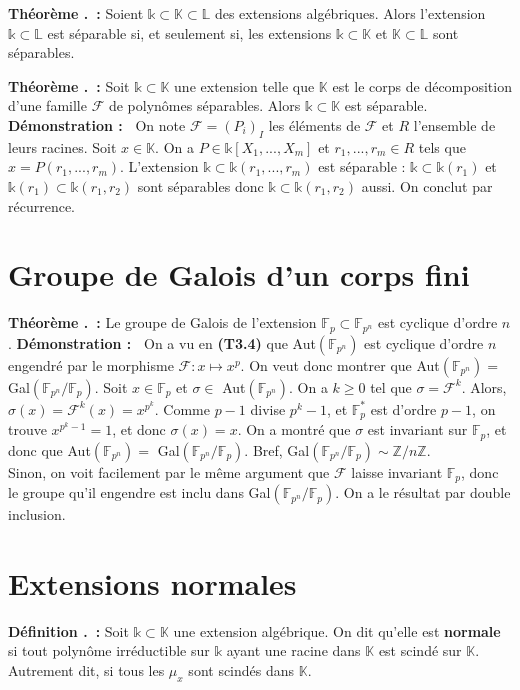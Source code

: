 \documentclass[5pt,a4paper]{article}
\newcounter{defin}[section]
\newcounter{thm}[section]
\renewcommand{\thedefin}{\thesection.\arabic{defin}}
\renewcommand{\thethm}{\thesection.\arabic{thm}}
\newcommand{\defin}[1]{\stepcounter{defin}\noindent\textbf{Définition \thedefin ~:} #1 \newline}
\newcommand{\thm}[1]{\stepcounter{thm}\noindent\textbf{Théorème \thethm ~:} #1 \newline}
\newcommand{\demo}[1]{\textbf{Démonstration :~} #1 \newline}
\begin{document}
\begin{onehalfspacing}
\thm{Soient $\mathds{k} \subset \mathbb{K} \subset \mathbb{L}$ des extensions algébriques. Alors l'extension $\mathds{k} \subset \mathbb{L}$ est séparable si, et seulement si, les extensions $\mathds{k} \subset \mathbb{K}$ et $\mathbb{K} \subset \mathbb{L}$ sont séparables.}


\thm{Soit $\mathds{k} \subset \mathbb{K}$ une extension telle que $\mathbb{K}$ est le corps de décomposition d'une famille $\mathcal{F}$ de polynômes séparables. Alors $\mathds{k} \subset \mathbb{K}$ est séparable.}
\demo{On note $\mathcal{F} = (P_i)_I$ les éléments de $\mathcal{F}$ et $R$ l'ensemble de leurs racines. Soit $x \in \mathbb{K}$. On a $P \in \mathds{k}[X_1, ..., X_m]$ et $r_1, ..., r_m \in R$ tels que $x = P(r_1, ..., r_m)$. L'extension $\mathds{k} \subset \mathds{k}(r_1, ..., r_m)$ est séparable : $\mathds{k} \subset \mathds{k}(r_1)$ et $\mathds{k}(r_1) \subset \mathds{k}(r_1, r_2)$ sont séparables donc $\mathds{k} \subset \mathds{k}(r_1, r_2)$ aussi. On conclut par récurrence.}

\newpage
\section{Groupe de Galois d'un corps fini}
\thm{Le groupe de Galois de l'extension $\mathbb{F}_p \subset \mathbb{F}_{p^n}$ est cyclique d'ordre $n$.}
\demo{On a vu en \textbf{(T3.4)} que Aut$(\mathbb{F}_{p^n})$ est cyclique d'ordre $n$ engendré par le morphisme $\mathcal{F} : x \mapsto x^p$. On veut donc montrer que Aut$(\mathbb{F}_{p^n}) = $ Gal$(\mathbb{F}_{p^n}/\mathbb{F}_p)$. Soit $x \in \mathbb{F}_p$ et $\sigma \in $ Aut$(\mathbb{F}_{p^n})$. On a $k \geq 0$ tel que $\sigma = \mathcal{F}^k$. Alors, $\sigma(x) = \mathcal{F}^k(x) = x^{p^k}$. Comme $p - 1$ divise $p^k - 1$, et $\mathbb{F}_p^*$ est d'ordre $p - 1$, on trouve $x^{p^k - 1} = 1$, et donc $\sigma(x) = x$. On a montré que $\sigma$ est invariant sur $\mathbb{F}_p$, et donc que Aut$(\mathbb{F}_{p^n}) = $ Gal$(\mathbb{F}_{p^n}/\mathbb{F}_p)$. Bref, Gal$(\mathbb{F}_{p^n}/\mathbb{F}_p) \sim \mathbb{Z}/n\mathbb{Z}$.
\\Sinon, on voit facilement par le même argument que $\mathcal{F}$ laisse invariant $\mathbb{F}_p$, donc le groupe qu'il engendre est inclu dans Gal$(\mathbb{F}_{p^n}/\mathbb{F}_p)$. On a le résultat par double inclusion.}

\newpage
\section{Extensions normales}
\defin{Soit $\mathds{k} \subset \mathbb{K}$ une extension algébrique. On dit qu'elle est \textbf{normale} si tout polynôme irréductible sur $\mathds{k}$ ayant une racine dans $\mathbb{K}$ est scindé sur $\mathbb{K}$. Autrement dit, si tous les $\mu_x$ sont scindés dans $\mathbb{K}$.}



\end{onehalfspacing}
\end{document}
